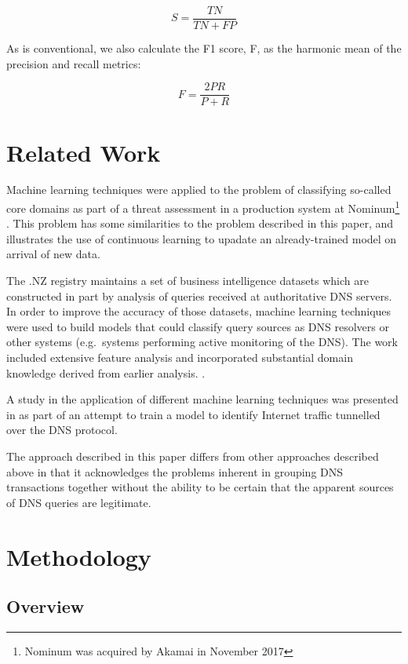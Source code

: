 \documentclass[conference]{IEEEtran}
\let\citep\cite
\begin{document}
\[S = \frac{TN}{TN + FP}\]

As is conventional, we also calculate the F1 score, F, as the harmonic
mean of the precision and recall metrics:

\[F = \frac{2PR}{P + R}\]

\section{Related Work}\label{sec:related-work}

\label{sec:related}

Machine learning techniques were applied to the problem of classifying
so-called core domains as part of a threat assessment in a production
system at
Nominum\footnote{Nominum was acquired by Akamai in November 2017}
\citep{Yuzifovichbotconf2017} \citep{YuzifovichOARC2017}. This problem
has some similarities to the problem described in this paper, and
illustrates the use of continuous learning to upadate an already-trained
model on arrival of new data.

The .NZ registry maintains a set of business intelligence datasets which
are constructed in part by analysis of queries received at authoritative
DNS servers. In order to improve the accuracy of those datasets, machine
learning techniques were used to build models that could classify query
sources as DNS resolvers or other systems (e.g.~systems performing
active monitoring of the DNS). The work included extensive feature
analysis and incorporated substantial domain knowledge derived from
earlier analysis. \citep{Qiao2018} \citep{QiaoOARC2018}.

A study in the application of different machine learning techniques was
presented in \citep{Sammour2017} as part of an attempt to train a model
to identify Internet traffic tunnelled over the DNS protocol.

The approach described in this paper differs from other approaches
described above in that it acknowledges the problems inherent in
grouping DNS transactions together without the ability to be certain
that the apparent sources of DNS queries are legitimate.

\section{Methodology}\label{sec:methodology}

\label{sec:methodology}

\subsection{Overview}\label{sec:overview}
\end{document}
